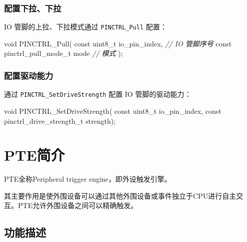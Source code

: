 \documentclass[
  12pt,
]{book}
\newenvironment{Shaded}{\begin{snugshade}}{\end{snugshade}}
\newcommand{\CommentTok}[1]{\textcolor[rgb]{0.56,0.35,0.01}{\textit{#1}}}
\newcommand{\DataTypeTok}[1]{\textcolor[rgb]{0.13,0.29,0.53}{#1}}
\newcommand{\NormalTok}[1]{#1}
\begin{document}
\hypertarget{ux914dux7f6eux4e0bux62c9ux4e0bux62c9}{%
\subsection{配置下拉、下拉}\label{ux914dux7f6eux4e0bux62c9ux4e0bux62c9}}

IO 管脚的上拉、下拉模式通过 \texttt{PINCTRL\_Pull} 配置：

\begin{Shaded}
\begin{Highlighting}[]
\DataTypeTok{void}\NormalTok{ PINCTRL_Pull(}
  \DataTypeTok{const} \DataTypeTok{uint8_t}\NormalTok{ io_pin_index,     }\CommentTok{// IO 管脚序号}
  \DataTypeTok{const}\NormalTok{ pinctrl_pull_mode_t mode  }\CommentTok{// 模式}
\NormalTok{  );}
\end{Highlighting}
\end{Shaded}

\hypertarget{ux914dux7f6eux9a71ux52a8ux80fdux529b}{%
\subsection{配置驱动能力}\label{ux914dux7f6eux9a71ux52a8ux80fdux529b}}

通过 \texttt{PINCTRL\_SetDriveStrength} 配置 IO 管脚的驱动能力：

\begin{Shaded}
\begin{Highlighting}[]
\DataTypeTok{void}\NormalTok{ PINCTRL_SetDriveStrength(}
  \DataTypeTok{const} \DataTypeTok{uint8_t}\NormalTok{ io_pin_index,}
  \DataTypeTok{const}\NormalTok{ pinctrl_drive_strength_t strength);}
\end{Highlighting}
\end{Shaded}

\hypertarget{pteux7b80ux4ecb}{%
\chapter{PTE简介}\label{pteux7b80ux4ecb}}

PTE全称Peripheral trigger engine，即外设触发引擎。

其主要作用是使外围设备可以通过其他外围设备或事件独立于CPU进行自主交互。PTE允许外围设备之间可以精确触发。

\hypertarget{ux529fux80fdux63cfux8ff0-3}{%
\section{功能描述}\label{ux529fux80fdux63cfux8ff0-3}}
\end{document}
